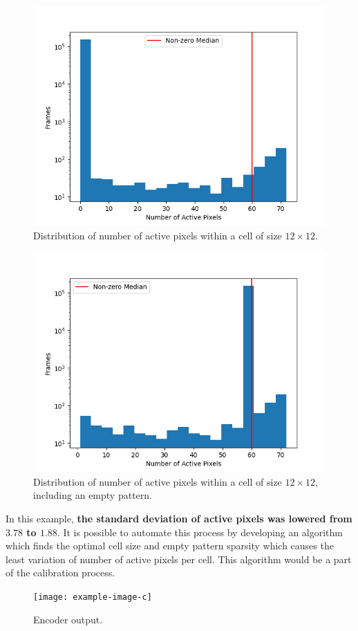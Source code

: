 \begin{figure}[H]
    \centering
    \includegraphics[width=\textwidth]{resources/methodology/active_pixels_dist.png}
    \caption{Distribution of number of active pixels within a cell of size $12\times 12$.}
    \label{fig:num_active_pixels_cell}
\end{figure}
\begin{figure}[H]
    \centering
    \includegraphics[width=\textwidth]{resources/methodology/active_pixels_dist2.png}
    \caption{Distribution of number of active pixels within a cell of size $12\times 12$, including an empty pattern.}
    \label{fig:num_active_pixels_cell2}
\end{figure}
In this example, \textbf{the standard deviation of active pixels was lowered from $\mathbf{3.78}$ to $\mathbf{1.88}$}. It is possible to automate this process by developing an algorithm which finds the optimal cell size and empty pattern sparsity which causes the least variation of number of active pixels per cell. This algorithm would be a part of the calibration process.
\begin{figure}[H]
    \centering
    \texttt{[image: example-image-c]}
    \caption{Encoder output.}
    \label{fig:encoder_output}
\end{figure}

